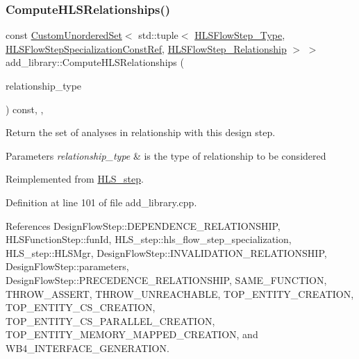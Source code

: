 \subsubsection{\texorpdfstring{Compute\+H\+L\+S\+Relationships()}{ComputeHLSRelationships()}}
{\footnotesize\ttfamily const \hyperlink{classCustomUnorderedSet}{Custom\+Unordered\+Set}$<$ std\+::tuple$<$ \hyperlink{hls__step_8hpp_ada16bc22905016180e26fc7e39537f8d}{H\+L\+S\+Flow\+Step\+\_\+\+Type}, \hyperlink{hls__step_8hpp_a5fdd2edf290c196531d21d68e13f0e74}{H\+L\+S\+Flow\+Step\+Specialization\+Const\+Ref}, \hyperlink{hls__step_8hpp_a3ad360b9b11e6bf0683d5562a0ceb169}{H\+L\+S\+Flow\+Step\+\_\+\+Relationship} $>$ $>$ add\+\_\+library\+::\+Compute\+H\+L\+S\+Relationships (\begin{DoxyParamCaption}\item[{const \hyperlink{classDesignFlowStep_a723a3baf19ff2ceb77bc13e099d0b1b7}{Design\+Flow\+Step\+::\+Relationship\+Type}}]{relationship\+\_\+type }\end{DoxyParamCaption}) const\hspace{0.3cm}{\ttfamily [override]}, {\ttfamily [private]}, {\ttfamily [virtual]}}



Return the set of analyses in relationship with this design step. 


\begin{DoxyParams}{Parameters}
{\em relationship\+\_\+type} & is the type of relationship to be considered \\
\hline
\end{DoxyParams}


Reimplemented from \hyperlink{classHLS__step_aed0ce8cca9a1ef18e705fc1032ad4de5}{H\+L\+S\+\_\+step}.



Definition at line 101 of file add\+\_\+library.\+cpp.



References Design\+Flow\+Step\+::\+D\+E\+P\+E\+N\+D\+E\+N\+C\+E\+\_\+\+R\+E\+L\+A\+T\+I\+O\+N\+S\+H\+IP, H\+L\+S\+Function\+Step\+::fun\+Id, H\+L\+S\+\_\+step\+::hls\+\_\+flow\+\_\+step\+\_\+specialization, H\+L\+S\+\_\+step\+::\+H\+L\+S\+Mgr, Design\+Flow\+Step\+::\+I\+N\+V\+A\+L\+I\+D\+A\+T\+I\+O\+N\+\_\+\+R\+E\+L\+A\+T\+I\+O\+N\+S\+H\+IP, Design\+Flow\+Step\+::parameters, Design\+Flow\+Step\+::\+P\+R\+E\+C\+E\+D\+E\+N\+C\+E\+\_\+\+R\+E\+L\+A\+T\+I\+O\+N\+S\+H\+IP, S\+A\+M\+E\+\_\+\+F\+U\+N\+C\+T\+I\+ON, T\+H\+R\+O\+W\+\_\+\+A\+S\+S\+E\+RT, T\+H\+R\+O\+W\+\_\+\+U\+N\+R\+E\+A\+C\+H\+A\+B\+LE, T\+O\+P\+\_\+\+E\+N\+T\+I\+T\+Y\+\_\+\+C\+R\+E\+A\+T\+I\+ON, T\+O\+P\+\_\+\+E\+N\+T\+I\+T\+Y\+\_\+\+C\+S\+\_\+\+C\+R\+E\+A\+T\+I\+ON, T\+O\+P\+\_\+\+E\+N\+T\+I\+T\+Y\+\_\+\+C\+S\+\_\+\+P\+A\+R\+A\+L\+L\+E\+L\+\_\+\+C\+R\+E\+A\+T\+I\+ON, T\+O\+P\+\_\+\+E\+N\+T\+I\+T\+Y\+\_\+\+M\+E\+M\+O\+R\+Y\+\_\+\+M\+A\+P\+P\+E\+D\+\_\+\+C\+R\+E\+A\+T\+I\+ON, and W\+B4\+\_\+\+I\+N\+T\+E\+R\+F\+A\+C\+E\+\_\+\+G\+E\+N\+E\+R\+A\+T\+I\+ON.


